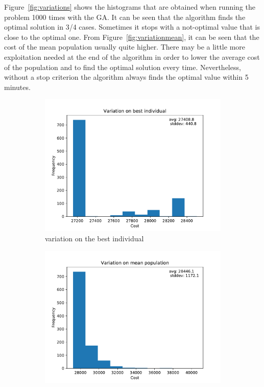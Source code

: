 \documentclass[a4paper,10pt]{article}
\begin{document}
Figure~\ref{fig:variations} shows the histograms that are obtained when running the problem 1000 times with the GA. It can be seen that the algorithm finds the optimal solution in 3/4 cases. Sometimes it stops with a not-optimal value that is close to the optimal one. From Figure~\ref{fig:variationmean}, it can be seen that the cost of the mean population usually quite higher. There may be a little more exploitation needed at the end of the algorithm in order to lower the average cost of the population and to find the optimal solution every time. Nevertheless, without a stop criterion the algorithm always finds the optimal value within 5 minutes.
\begin{figure}[H]
    \begin{subfigure}{0.55\linewidth}
      \centering
      \includegraphics[width=\linewidth]{img/variationbest.pdf}
      \caption{variation on the best individual}
      \label{fig:variationbest}
    \end{subfigure}
    \begin{subfigure}{0.5\linewidth}
      \centering
      \includegraphics[width=\linewidth]{img/variationmean2.pdf      }

\end{subfigure}
\end{figure}
\end{document}
